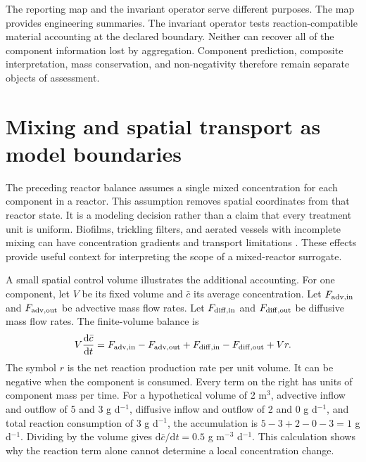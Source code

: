 The reporting map and the invariant operator serve different purposes. The map provides engineering summaries. The invariant operator tests reaction-compatible material accounting at the declared boundary. Neither can recover all of the component information lost by aggregation. Component prediction, composite interpretation, mass conservation, and non-negativity therefore remain separate objects of assessment.


\section{Mixing and spatial transport as model boundaries}

The preceding reactor balance assumes a single mixed concentration for each component in a reactor. This assumption removes spatial coordinates from that reactor state. It is a modeling decision rather than a claim that every treatment unit is uniform. Biofilms, trickling filters, and aerated vessels with incomplete mixing can have concentration gradients and transport limitations \citep{Wik2003,Zhang1994,SadinoRiquelme2023}. These effects provide useful context for interpreting the scope of a mixed-reactor surrogate.

A small spatial control volume illustrates the additional accounting. For one component, let $V$ be its fixed volume and $\bar c$ its average concentration. Let $F_{\rm adv,in}$ and $F_{\rm adv,out}$ be advective mass flow rates. Let $F_{\rm diff,in}$ and $F_{\rm diff,out}$ be diffusive mass flow rates. The finite-volume balance is
\begin{equation}
V\frac{\mathrm d\bar c}{\mathrm dt}
=F_{\rm adv,in}-F_{\rm adv,out}
+F_{\rm diff,in}-F_{\rm diff,out}+Vr.
\label{eq:teaching_spatial_control_volume}
\end{equation}
The symbol $r$ is the net reaction production rate per unit volume. It can be negative when the component is consumed. Every term on the right has units of component mass per time. For a hypothetical volume of 2 m$^3$, advective inflow and outflow of 5 and 3 g d$^{-1}$, diffusive inflow and outflow of 2 and 0 g d$^{-1}$, and total reaction consumption of 3 g d$^{-1}$, the accumulation is $5-3+2-0-3=1$ g d$^{-1}$. Dividing by the volume gives $\mathrm d\bar c/\mathrm dt=0.5$ g m$^{-3}$ d$^{-1}$. This calculation shows why the reaction term alone cannot determine a local concentration change.

